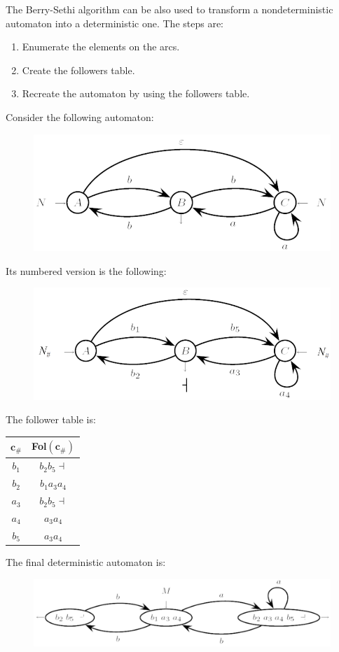 The Berry-Sethi algorithm can be also used to transform a nondeterministic automaton into a deterministic one. 
The steps are: 
\begin{enumerate}
    \item Enumerate the elements on the arcs. 
    \item Create the followers table. 
    \item Recreate the automaton by using the followers table. 
\end{enumerate}
\begin{example}
    Consider the following automaton: 
    \begin{figure}[H]
        \centering
        \includegraphics[width=0.5\linewidth]{images/bs1.png}
    \end{figure}
    Its numbered version is the following: 
    \begin{figure}[H]
        \centering
        \includegraphics[width=0.5\linewidth]{images/bs2.png}
    \end{figure}
    The follower table is: 
    \begin{table}[H]
        \centering
        \begin{tabular}{cc}
        \hline
        \textbf{$\boldsymbol{c_{\#}}$} & \textbf{Fol$(\boldsymbol{c_{\#}})$} \\ \hline
        $b_1$                          & $b_2b_5\dashv$                      \\
        $b_2$                          & $b_1a_3a_4$                         \\
        $a_3$                          & $b_2b_5\dashv$                      \\
        $a_4$                          & $a_3a_4$                            \\
        $b_5$                          & $a_3a_4$                            \\ \hline
        \end{tabular}
    \end{table}
    The final deterministic automaton is: 
    \begin{figure}[H]
        \centering
        \includegraphics[width=0.7\linewidth]{images/bs3.png}
    \end{figure}
\end{example}